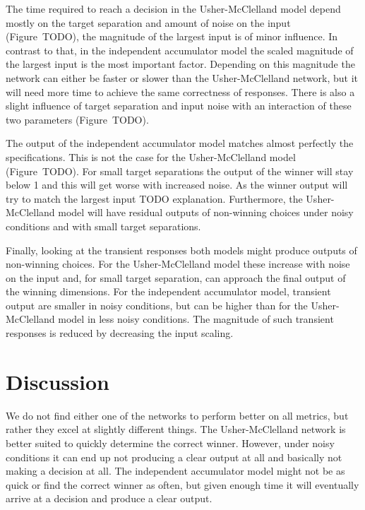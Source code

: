 \documentclass[10pt,letterpaper]{article}
\begin{document}
The time required to reach a decision in the Usher-McClelland model depend 
mostly on the target separation and amount of noise on the input (Figure~TODO), 
the magnitude of the largest input is of minor influence. In contrast to that, 
in the independent accumulator model the scaled magnitude of the largest input 
is the most important factor. Depending on this magnitude the network can either 
be faster or slower than the Usher-McClelland network, but it will need more 
time to achieve the same correctness of responses. There is also a slight 
influence of target separation and input noise with an interaction of these two 
parameters (Figure~TODO).

The output of the independent accumulator model matches almost perfectly the 
specifications. This is not the case for the Usher-McClelland model 
(Figure~TODO).  For small target separations the output of the winner will stay 
below 1 and this will get worse with increased noise. As the winner output will 
try to match the largest input TODO explanation. Furthermore, the 
Usher-McClelland model will have residual outputs of non-winning choices under 
noisy conditions and with small target separations.

Finally, looking at the transient responses both models might produce outputs of 
non-winning choices. For the Usher-McClelland model these increase with noise on 
the input and, for small target separation, can approach the final output of the 
winning dimensions. For the independent accumulator model, transient output are 
smaller in noisy conditions, but can be higher than for the Usher-McClelland 
model in less noisy conditions. The magnitude of such transient responses is 
reduced by decreasing the input scaling.

\section{Discussion}\label{sec:discussion}
We do not find either one of the networks to perform better on all metrics, but 
rather they excel at slightly different things. The Usher-McClelland network is 
better suited to quickly determine the correct winner. However, under noisy 
conditions it can end up not producing a clear output at all and basically not 
making a decision at all. The independent accumulator model might not be as 
quick or find the correct winner as often, but given enough time it will 
eventually arrive at a decision and produce a clear output.
\end{document}
